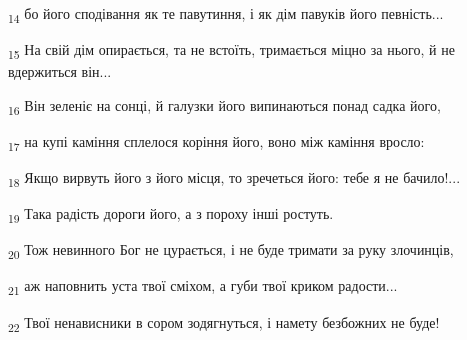 \begin{tcolorbox}
\textsubscript{14} бо його сподівання як те павутиння, і як дім павуків його певність...
\end{tcolorbox}
\begin{tcolorbox}
\textsubscript{15} На свій дім опирається, та не встоїть, тримається міцно за нього, й не вдержиться він...
\end{tcolorbox}
\begin{tcolorbox}
\textsubscript{16} Він зеленіє на сонці, й галузки його випинаються понад садка його,
\end{tcolorbox}
\begin{tcolorbox}
\textsubscript{17} на купі каміння сплелося коріння його, воно між каміння вросло:
\end{tcolorbox}
\begin{tcolorbox}
\textsubscript{18} Якщо вирвуть його з його місця, то зречеться його: тебе я не бачило!...
\end{tcolorbox}
\begin{tcolorbox}
\textsubscript{19} Така радість дороги його, а з пороху інші ростуть.
\end{tcolorbox}
\begin{tcolorbox}
\textsubscript{20} Тож невинного Бог не цурається, і не буде тримати за руку злочинців,
\end{tcolorbox}
\begin{tcolorbox}
\textsubscript{21} аж наповнить уста твої сміхом, а губи твої криком радости...
\end{tcolorbox}
\begin{tcolorbox}
\textsubscript{22} Твої ненависники в сором зодягнуться, і намету безбожних не буде!
\end{tcolorbox}
